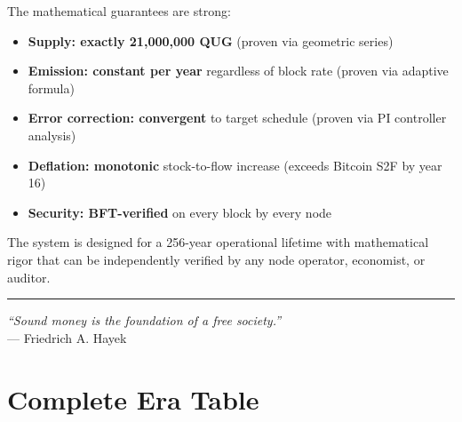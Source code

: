 \documentclass[11pt,a4paper]{article}
\begin{document}
The mathematical guarantees are strong:
\begin{itemize}
    \item \textbf{Supply: exactly 21,000,000 QUG} (proven via geometric series)
    \item \textbf{Emission: constant per year} regardless of block rate (proven via adaptive formula)
    \item \textbf{Error correction: convergent} to target schedule (proven via PI controller analysis)
    \item \textbf{Deflation: monotonic} stock-to-flow increase (exceeds Bitcoin S2F by year 16)
    \item \textbf{Security: BFT-verified} on every block by every node
\end{itemize}

The system is designed for a 256-year operational lifetime with mathematical rigor that can be independently verified by any node operator, economist, or auditor.

\vspace{1cm}
\hrule
\vspace{0.5cm}
\begin{center}
\textit{``Sound money is the foundation of a free society.''}\\
--- Friedrich A. Hayek
\end{center}

\appendix
\section{Complete Era Table}
\end{document}
